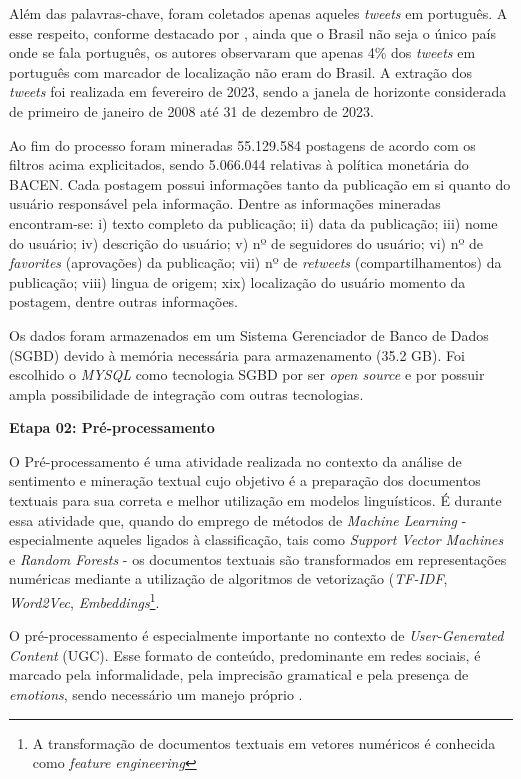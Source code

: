 Além das palavras-chave, foram coletados apenas aqueles \textit{tweets} em português. A esse respeito, conforme destacado por \textcite{de_melo_comparing_2021}, ainda que o Brasil não seja o único país onde se fala português, os autores observaram que apenas 4\% dos \textit{tweets} em português com marcador de localização não eram do Brasil. A extração dos \textit{tweets} foi realizada em fevereiro de 2023, sendo a janela de horizonte considerada de primeiro de janeiro de 2008 até 31 de dezembro de 2023.

Ao fim do processo foram mineradas 55.129.584 postagens de acordo com os filtros acima explicitados, sendo 5.066.044 relativas à política monetária do BACEN. Cada postagem possui informações tanto da publicação em si quanto do usuário responsável pela informação. Dentre as informações mineradas encontram-se: i) texto completo da publicação; ii) data da publicação; iii) nome do usuário; iv) descrição do usuário; v) nº de seguidores do usuário; vi) nº de \textit{favorites} (aprovações) da publicação; vii) nº de \textit{retweets} (compartilhamentos) da publicação; viii) lingua de origem; xix) localização do usuário momento da postagem, dentre outras informações. 

Os dados foram armazenados em um Sistema Gerenciador de Banco de Dados (SGBD) devido à memória necessária para armazenamento (35.2 GB). Foi escolhido o \textit{MYSQL} como tecnologia SGBD por ser \textit{open source} e por possuir ampla possibilidade de integração com outras tecnologias.

\bigskip

\textbf{Etapa 02: Pré-processamento}

O Pré-processamento é uma atividade realizada no contexto da análise de sentimento e mineração textual cujo objetivo é a preparação dos documentos textuais para sua correta e melhor utilização em modelos linguísticos. É durante essa atividade que, quando do emprego de métodos de \textit{Machine Learning} - especialmente aqueles ligados à classificação, tais como \textit{Support Vector Machines} e \textit{Random Forests} - os documentos textuais são transformados em representações numéricas mediante a utilização de algoritmos de vetorização (\textit{TF-IDF}, \textit{Word2Vec}, \textit{Embeddings}\footnote{A transformação de documentos textuais em vetores numéricos é conhecida como \textit{feature engineering}}. 

O pré-processamento é especialmente importante no contexto de \textit{User-Generated Content} (UGC). Esse formato de conteúdo, predominante em redes sociais, é marcado pela informalidade, pela imprecisão gramatical e pela presença de \textit{emotions}, sendo necessário um manejo próprio \parencite{cirqueira_literature_2018}.


